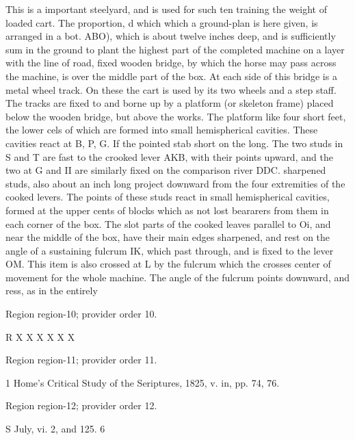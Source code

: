 \documentclass[11pt]{article}
\begin{document}
This is a important steelyard, and is used for such ten training the weight of loaded cart. The proportion, d which which a ground-plan is here given, is arranged in a bot. ABO), which is about twelve inches deep, and is sufficiently sum in the ground to plant the highest part of the completed machine on a layer with the line of road, fixed wooden bridge, by which the horse may pass across the machine, is over the middle part of the box. At each side of this bridge is a metal wheel track. On these the cart is used by its two wheels and a step staff. The tracks are fixed to and borne up by a platform (or skeleton frame) placed below the wooden bridge, but above the works. The platform like four short feet, the lower cels of which are formed into small hemispherical cavities. These cavities react at B, P, G. If the pointed stab short on the long. The two studs in S and T are fast to the crooked lever AKB, with their points upward, and the two at G and II are similarly fixed on the comparison river DDC. sharpened studs, also about an inch long project downward from the four extremities of the cooked levers. The points of these studs react in small hemispherical cavities, formed at the upper cents of blocks which as not lost beararers from them in each corner of the box. The slot parts of the cooked leaves parallel to Oi, and near the middle of the box, have their main edges sharpened, and rest on the angle of a sustaining fulcrum IK, which past through, and is fixed to the lever OM. This item is also crossed at L by the fulcrum which the crosses center of movement for the whole machine. The angle of the fulcrum points downward, and ress, as in the entirely
\par

{\scriptsize\color{gray} Region region-10; provider order 10.\par}
\medskip

R
X
X
X
X
X
X
\par

{\scriptsize\color{gray} Region region-11; provider order 11.\par}
\medskip

1 Home’s Critical Study of the Seriptures, 1825, v. in, pp. 74, 76.
\par

{\scriptsize\color{gray} Region region-12; provider order 12.\par}
\medskip

S July, vi. 2, and 125. 6
\par
\end{document}
